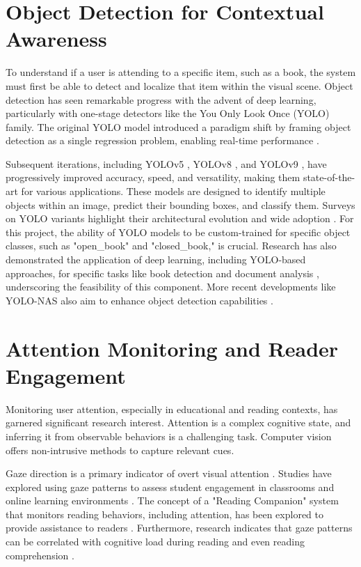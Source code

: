 \section{Object Detection for Contextual Awareness}
To understand if a user is attending to a specific item, such as a book, the system must first be able to detect and localize that item within the visual scene. Object detection has seen remarkable progress with the advent of deep learning, particularly with one-stage detectors like the You Only Look Once (YOLO) family. The original YOLO model introduced a paradigm shift by framing object detection as a single regression problem, enabling real-time performance \cite{Redmon_YOLO_2016}.

Subsequent iterations, including YOLOv5 \cite{Jocher_YOLOv5_2020}, YOLOv8 \cite{ultralytics_yolov8_2023}, and YOLOv9 \cite{Wang_YOLOv9_2024}, have progressively improved accuracy, speed, and versatility, making them state-of-the-art for various applications. These models are designed to identify multiple objects within an image, predict their bounding boxes, and classify them. Surveys on YOLO variants highlight their architectural evolution and wide adoption \cite{Terven_YOLOSurvey_2023, DiSalvo_YOLOSurvey_2021}. For this project, the ability of YOLO models to be custom-trained for specific object classes, such as "open\_book" and "closed\_book," is crucial. Research has also demonstrated the application of deep learning, including YOLO-based approaches, for specific tasks like book detection and document analysis \cite{Ahmad_BookDetection_2023}, underscoring the feasibility of this component. More recent developments like YOLO-NAS also aim to enhance object detection capabilities \cite{Deci_YOLONAS_2023}.

\section{Attention Monitoring and Reader Engagement}
Monitoring user attention, especially in educational and reading contexts, has garnered significant research interest. Attention is a complex cognitive state, and inferring it from observable behaviors is a challenging task. Computer vision offers non-intrusive methods to capture relevant cues.

Gaze direction is a primary indicator of overt visual attention \cite{article}. Studies have explored using gaze patterns to assess student engagement in classrooms \cite{Sharma_AttentionClassroom_2023} and online learning environments \cite{Li_StudentEngagementOnline_2023, Guo_StudentAttentionSurvey_2023}. The concept of a "Reading Companion" system that monitors reading behaviors, including attention, has been explored to provide assistance to readers \cite{Lai_ReadingCompanion_2017}. Furthermore, research indicates that gaze patterns can be correlated with cognitive load during reading \cite{Ghosh_CognitiveLoadReading_2022} and even reading comprehension \cite{Bao_GazeReadingComprehension_2023}.

